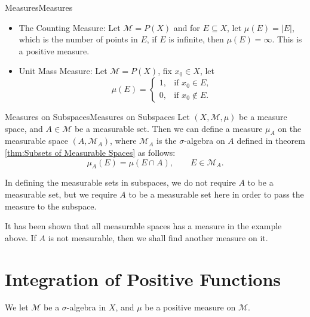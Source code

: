 \documentclass[../main.tex]{subfiles}
\begin{document}
\begin{example}{Measures}{Measures}
\begin{itemize}
	\item The Counting Measure: Let $\mathcal{M} = P(X)$ and for $E \subseteq X$, let $\mu(E) = \left|E\right|$, which is the number of points in $E$, if $E$ is infinite, then $\mu(E) = \infty $. This is a positive measure.
	\item Unit Mass Measure: Let $\mathcal{M} = P(X)$, fix $x_0\in X$, let
	\begin{equation*}
		\mu(E) =
		\begin{cases}
			1, & \text{if } x_0 \in E, \\
			0, & \text{if } x_0 \notin E.
		\end{cases}
	\end{equation*}
\end{itemize}
\end{example}

\begin{theorem}{Measures on Subspaces}{Measures on Subspaces}
	Let $(X, \mathcal{M}, \mu)$ be a measure space, and $A\in \mathcal{M}$ be a measurable set. Then we can define a measure $\mu_A$ on the measurable space $(A, \mathcal{M}_A)$, where $\mathcal{M}_A$ is the $\sigma$-algebra on $A$ defined in theorem \ref{thm:Subsets of Measurable Spaces} as follows:
	\begin{equation*}
		\mu_A(E) = \mu(E \cap A), \qquad E\in \mathcal{M}_A.
	\end{equation*}
\end{theorem}
\begin{remark}
In defining the measurable sets in subspaces, we do not require $A$ to be a measurable set, but we require $A$ to be a measurable set here in order to pass the measure to the subspace.

It has been shown that all measurable spaces has a measure in the example above. If $A$ is not measurable, then we shall find another measure on it.
\end{remark}

\section{Integration of Positive Functions}
We let $\mathcal{M}$ be a $\sigma$-algebra in $X$, and $\mu$ be a positive measure on $\mathcal{M}$.
\end{document}

